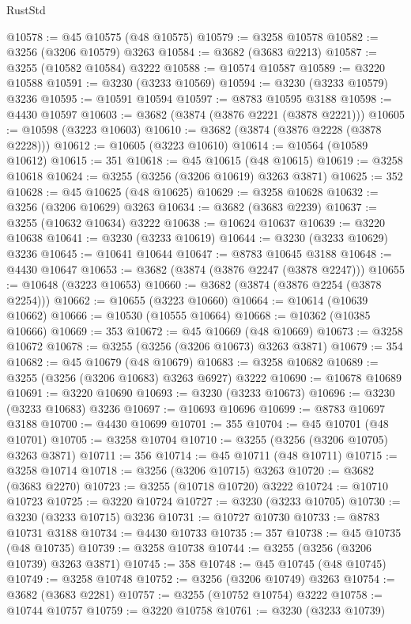 \begin{lexlean}{RustStd}
\begin{coremodule}
{\begin{coremodule}
{{{{{{{{{{{{{{{{{{{{{{{{{{{{{{{{{{{{{@10578 := @45 @10575 (@48 @10575)
@10579 := @3258 @10578
@10582 := @3256 (@3206 @10579) @3263
@10584 := @3682 (@3683 @2213)
@10587 := @3255 (@10582 @10584) @3222
@10588 := @10574 @10587
@10589 := @3220 @10588
@10591 := @3230 (@3233 @10569)
@10594 := @3230 (@3233 @10579) @3236
@10595 := @10591 @10594
@10597 := @8783 @10595 @3188
@10598 := @4430 @10597
@10603 := @3682 (@3874 (@3876 @2221 (@3878 @2221)))
@10605 := @10598 (@3223 @10603)
@10610 := @3682 (@3874 (@3876 @2228 (@3878 @2228)))
@10612 := @10605 (@3223 @10610)
@10614 := @10564 (@10589 @10612)
@10615 := 351
@10618 := @45 @10615 (@48 @10615)
@10619 := @3258 @10618
@10624 := @3255 (@3256 (@3206 @10619) @3263 @3871)
@10625 := 352
@10628 := @45 @10625 (@48 @10625)
@10629 := @3258 @10628
@10632 := @3256 (@3206 @10629) @3263
@10634 := @3682 (@3683 @2239)
@10637 := @3255 (@10632 @10634) @3222
@10638 := @10624 @10637
@10639 := @3220 @10638
@10641 := @3230 (@3233 @10619)
@10644 := @3230 (@3233 @10629) @3236
@10645 := @10641 @10644
@10647 := @8783 @10645 @3188
@10648 := @4430 @10647
@10653 := @3682 (@3874 (@3876 @2247 (@3878 @2247)))
@10655 := @10648 (@3223 @10653)
@10660 := @3682 (@3874 (@3876 @2254 (@3878 @2254)))
@10662 := @10655 (@3223 @10660)
@10664 := @10614 (@10639 @10662)
@10666 := @10530 (@10555 @10664)
@10668 := @10362 (@10385 @10666)
@10669 := 353
@10672 := @45 @10669 (@48 @10669)
@10673 := @3258 @10672
@10678 := @3255 (@3256 (@3206 @10673) @3263 @3871)
@10679 := 354
@10682 := @45 @10679 (@48 @10679)
@10683 := @3258 @10682
@10689 := @3255 (@3256 (@3206 @10683) @3263 @6927) @3222
@10690 := @10678 @10689
@10691 := @3220 @10690
@10693 := @3230 (@3233 @10673)
@10696 := @3230 (@3233 @10683) @3236
@10697 := @10693 @10696
@10699 := @8783 @10697 @3188
@10700 := @4430 @10699
@10701 := 355
@10704 := @45 @10701 (@48 @10701)
@10705 := @3258 @10704
@10710 := @3255 (@3256 (@3206 @10705) @3263 @3871)
@10711 := 356
@10714 := @45 @10711 (@48 @10711)
@10715 := @3258 @10714
@10718 := @3256 (@3206 @10715) @3263
@10720 := @3682 (@3683 @2270)
@10723 := @3255 (@10718 @10720) @3222
@10724 := @10710 @10723
@10725 := @3220 @10724
@10727 := @3230 (@3233 @10705)
@10730 := @3230 (@3233 @10715) @3236
@10731 := @10727 @10730
@10733 := @8783 @10731 @3188
@10734 := @4430 @10733
@10735 := 357
@10738 := @45 @10735 (@48 @10735)
@10739 := @3258 @10738
@10744 := @3255 (@3256 (@3206 @10739) @3263 @3871)
@10745 := 358
@10748 := @45 @10745 (@48 @10745)
@10749 := @3258 @10748
@10752 := @3256 (@3206 @10749) @3263
@10754 := @3682 (@3683 @2281)
@10757 := @3255 (@10752 @10754) @3222
@10758 := @10744 @10757
@10759 := @3220 @10758
@10761 := @3230 (@3233 @10739)
}}}}}}}}}}}}}}}}}}}}}}}}}}}}}}}}}}}}}
\end{coremodule}}
\end{coremodule}
\end{lexlean}
